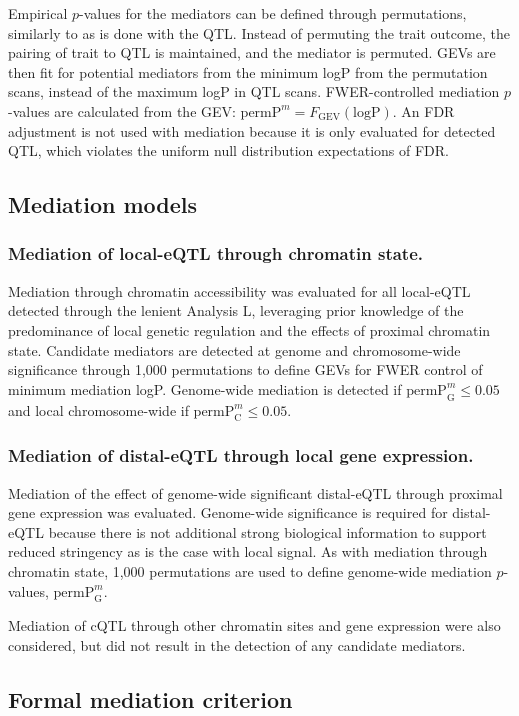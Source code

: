\documentclass[9pt,twocolumn,twoside]{gsajnl}
\newcommand{\permpmed}{\text{permP}^{m}}
\begin{document}
Empirical $p$-values for the mediators can be defined through permutations, similarly to as is done with the QTL. Instead of permuting the trait outcome, the pairing of trait to QTL is maintained, and the mediator is permuted. GEVs are then fit for potential mediators from the minimum logP from the permutation scans, instead of the maximum logP in QTL scans. FWER-controlled mediation $p$-values are calculated from the GEV: $\permpmed = F_{\text{GEV}}(\text{logP})$. An FDR adjustment is not used with mediation because it is only evaluated for detected QTL, which violates the uniform null distribution expectations of FDR.

\subsection{Mediation models}

\subsubsection{Mediation of local-eQTL through chromatin state.}
Mediation through chromatin accessibility was evaluated for all local-eQTL detected through the lenient Analysis L, leveraging prior knowledge of the predominance of local genetic regulation and the effects of proximal chromatin state. Candidate mediators are detected at genome and chromosome-wide significance through 1,000 permutations to define GEVs for FWER control of minimum mediation logP. Genome-wide mediation is detected if $\permpmed_{\text{G}} \leq 0.05$ and local chromosome-wide if $\permpmed_{\text{C}} \leq 0.05$. 

\subsubsection{Mediation of distal-eQTL through local gene expression.}
Mediation of the effect of genome-wide significant distal-eQTL through proximal gene expression was evaluated. Genome-wide significance is required for distal-eQTL because there is not additional strong biological information to support reduced stringency as is the case with local signal. As with mediation through chromatin state, 1,000 permutations are used to define genome-wide mediation $p$-values, $\permpmed_{\text{G}}$. 

Mediation of cQTL through other chromatin sites and gene expression were also considered, but did not result in the detection of any candidate mediators.

\subsection{Formal mediation criterion}
\end{document}
